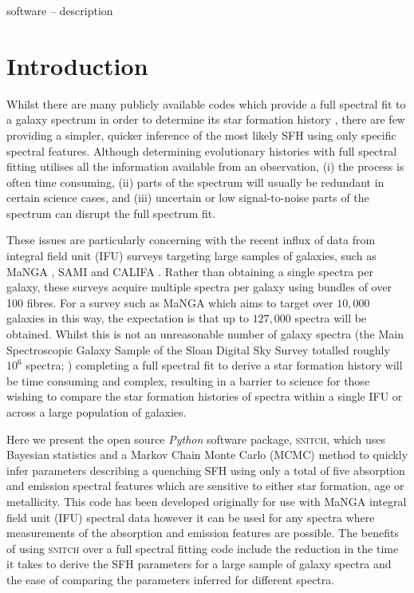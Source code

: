 \documentclass[useAMS,usenatbib]{mn2e}
\begin{document}
\begin{keywords}
software -- description
\end{keywords}

\section{Introduction}

Whilst there are many publicly available codes which provide a full spectral fit to a galaxy spectrum in order to determine its star formation history \citep[SFH;][]{cappellari04, cidfernandes05, ocvirk06, tojeiro07, noll09, conroy14, chevallard16, wilkinson17}, there are few providing a simpler, quicker inference of the most likely SFH using only specific spectral features. Although determining evolutionary histories with full spectral fitting utilises all the information available from an observation, (i) the process is often time consuming, (ii) parts of the spectrum will usually be redundant in certain science cases, and (iii) uncertain or low signal-to-noise parts of the spectrum can disrupt the full spectrum fit. 

These issues are particularly concerning with the recent influx of data from integral field unit (IFU) surveys targeting large samples of galaxies, such as MaNGA \protect\citep[Mapping Nearby Galaxies at Apache Point Observatory;][]{bundy15}, SAMI \protect\citep[Sydney-AAO Multi-object Integral-field spectrograph;][]{bryant12} and CALIFA \protect\citep[Calar Alto Legacy Integral Field spectroscopy Area survey;][]{sanchez12}. Rather than obtaining a single spectra per galaxy, these surveys acquire multiple spectra per galaxy using bundles of over 100 fibres. For a survey such as MaNGA which aims to target over $10,000$ galaxies in this way, the expectation is that up to $127,000$ spectra will be obtained. Whilst this is not an unreasonable number of galaxy spectra (the Main Spectroscopic Galaxy Sample of the Sloan Digital Sky Survey totalled roughly $10^6$ spectra; \citealt{strauss02}) completing a full spectral fit to derive a star formation history will be time consuming and complex, resulting in a barrier to science for those wishing to compare the star formation histories of spectra within a single IFU or across a large population of galaxies.

Here we present the open source \emph{Python} software package, \textsc{snitch}, which uses Bayesian statistics and a Markov Chain Monte Carlo (MCMC) method to quickly infer parameters describing a quenching SFH using only a total of five absorption and emission spectral features which are sensitive to either star formation, age or metallicity. This code has been developed originally for use with MaNGA integral field unit (IFU) spectral data however it can be used for any spectra where measurements of the absorption and emission features are possible. The benefits of using \textsc{snitch} over a full spectral fitting code include the reduction in the time it takes to derive the SFH parameters for a large sample of galaxy spectra and the ease of comparing the parameters inferred for different spectra.
\end{document}

